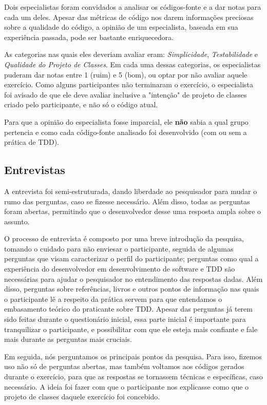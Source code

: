 \documentclass[conference]{IEEEtran}
\begin{document}
Dois especialistas foram convidados a analisar os códigos-fonte e a dar notas para cada
um deles. Apesar das métricas de código nos darem informações
preciosas sobre a qualidade do código, a opinião de um especialista, baseada
em sua experiência passada, pode ser bastante enriquecedora.

As categorias nas quais eles deveriam avaliar eram: \textit{Simplicidade}, \textit{Testabilidade} e
\textit{Qualidade do Projeto de Classes}.
Em cada uma dessas categorias, os especialistas puderam dar notas entre
1 (ruim) e 5 (bom), ou optar por não avaliar aquele exercício.
Como alguns participantes não terminaram o exercício, o especialista
foi avisado de que ele deve avaliar inclusive a "intenção" de projeto de classes criado
pelo participante, e não só o código atual. 

Para que a opinião do especialista fosse imparcial, ele \textbf{não} sabia a qual grupo
pertencia e como cada código-fonte analisado foi desenvolvido (com ou sem a prática de TDD).


\subsection{Entrevistas}
\label{sec:planejamento-estrategia-entrevistas}

A entrevista foi semi-estruturada, dando liberdade ao
pesquisador para mudar o rumo das perguntas, caso se fizesse necessário.
Além disso, todas as perguntas foram abertas, permitindo que o desenvolvedor desse
uma resposta ampla sobre o assunto.

O processo de entrevista é composto por uma breve introdução da pesquisa, tomando
o cuidado para não enviesar o participante, seguida de algumas perguntas que visam
caracterizar o perfil do participante; perguntas como qual a experiência do
desenvolvedor em desenvolvimento de software e TDD são necessárias para ajudar o
pesquisador no entendimento das respostas dadas. Além disso, perguntas sobre
referências, livros e outros pontos de informação nas quais o participante lê a
respeito da prática servem para que entendamos o embasamento teórico
do praticante sobre TDD. Apesar das perguntas já terem sido feitas durante
o questionário inicial, essa parte inicial é importante para tranquilizar
o participante, e possibilitar com que ele esteja mais confiante e fale
mais durante as perguntas mais cruciais.

Em seguida, nós perguntamos os principais pontos da pesquisa.
Para isso, fizemos uso não só de perguntas abertas, mas também
voltamos aos códigos gerados durante o exercício, para que as respostas se tornassem técnicas e
específicas, caso necessário. A ideia foi fazer com que o participante nos explicasse
como que o projeto de classes daquele exercício foi concebido.
\end{document}
